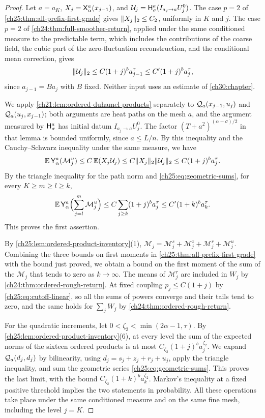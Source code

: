 \begin{proof}
Let $a=a_K$, $X_j=\mathsf X_{\alpha}^{a}(x_{j-1})$, and $\mathcal U_j=\mathsf H_{\sigma}^{a}(I_{a_j\to a}U_j^0)$. The case $p=2$ of \cref{ch25:thm:all-prefix-first-grade} gives $\lVert X_j\rVert_2\le C_2$, uniformly in $K$ and $j$. The case $p=2$ of \cref{ch24:thm:full-smoother-return}, applied under the same conditioned measure to the predictable term, which includes the contributions of the coarse field, the cubic part of the zero-fluctuation reconstruction, and the conditional mean correction, gives
\[
 \lVert \mathcal U_j\rVert_2\le C(1+j)^ba_{j-1}^\tau\le C'(1+j)^ba_j^\tau,
\]
since $a_{j-1}=Ba_j$ with $B$ fixed. Neither input uses an estimate of \cref{ch30:chapter}.

We apply \cref{ch21:lem:ordered-duhamel-products} separately to $\mathcal Q_{a}(x_{j-1},u_j)$ and $\mathcal Q_{a}(u_j,x_{j-1})$; both arguments are heat paths on the mesh $a$, and the argument measured by $\mathsf H_{\sigma}^{a}$ has initial datum $I_{a_j\to a}U_j^0$. The factor $(T+a^2)^{(\alpha-\sigma)/2}$ in that lemma is bounded uniformly, since $a\le L/n$. By this inequality and the Cauchy--Schwarz inequality under the same measure, we have
\[
 \mathbb E\,\mathsf Y_{\alpha}^{a}(\mathcal M_j^u)\le C\,\mathbb E(X_j\mathcal U_j)\le C\lVert X_j\rVert_2\lVert \mathcal U_j\rVert_2\le C(1+j)^ba_j^\tau.
\]
By the triangle inequality for the path norm and \eqref{ch25:eq:geometric-sums}, for every $K\ge m\ge l\ge k$,
\[
 \mathbb E\,\mathsf Y_{\alpha}^{a}\Bigl(\sum_{j=l}^m\mathcal M_j^u\Bigr)\le C\sum_{j\ge k}(1+j)^ba_j^\tau\le C'(1+k)^ba_k^\tau.
\]
This proves the first assertion.

By \cref{ch25:lem:ordered-product-inventory}(1), $\mathcal M_j=\mathcal M_j^s+\mathcal M_j^z+\mathcal M_j^r+\mathcal M_j^u$. Combining the three bounds on first moments in \cref{ch25:thm:all-prefix-first-grade} with the bound just proved, we obtain a bound on the first moment of the sum of the $\mathcal M_j$ that tends to zero as $k\to\infty$. The means of $\mathcal M_j^r$ are included in $W_j$ by \cref{ch24:thm:ordered-rough-return}. At fixed coupling $p_j\le C(1+j)$ by \eqref{ch25:eq:cutoff-linear}, so all the sums of powers converge and their tails tend to zero, and the same holds for $\sum_jW_j$ by \cref{ch24:thm:ordered-rough-return}.

For the quadratic increments, let $0<\zeta_2<\min(2\alpha-1,\tau)$. By \cref{ch25:lem:ordered-product-inventory}(6), at every level the sum of the expected norms of the sixteen ordered products is at most $C_{\zeta_2}(1+j)^ba_j^{\zeta_2}$. We expand $\mathcal Q_{a}(d_j,d_j)$ by bilinearity, using $d_j=s_j+z_j+r_j+u_j$, apply the triangle inequality, and sum the geometric series \eqref{ch25:eq:geometric-sums}. This proves the last limit, with the bound $C_{\zeta_2}(1+k)^ba_k^{\zeta_2}$. Markov's inequality at a fixed positive threshold implies the two statements in probability. All these operations take place under the same conditioned measure and on the same fine mesh, including the level $j=K$.
\end{proof}

